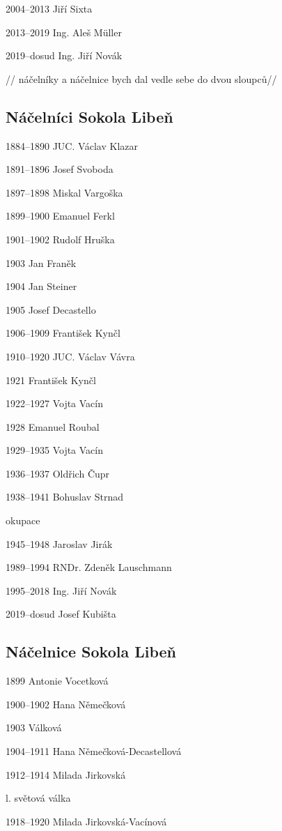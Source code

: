 \documentclass[a5paper, 11pt, twoside]{article}
\begin{document}
2004--2013 Jiří Sixta

2013--2019 Ing. Aleš Müller

2019--dosud Ing. Jiří Novák

// náčelníky a náčelnice bych dal vedle sebe do dvou sloupců//

\subsection{Náčelníci Sokola
Libeň}

1884--1890 JUC. Václav Klazar

1891--1896 Josef Svoboda

1897--1898 Miskal Vargoška

1899--1900 Emanuel Ferkl

1901--1902 Rudolf Hruška

1903 Jan Franěk

1904 Jan Steiner

1905 Josef Decastello

1906--1909 František Kynčl

1910--1920 JUC. Václav Vávra

1921 František Kynčl

1922--1927 Vojta Vacín

1928 Emanuel Roubal

1929--1935 Vojta Vacín

1936--1937 Oldřich Čupr

1938--1941 Bohuslav Strnad

okupace

1945--1948 Jaroslav Jirák

1989--1994 RNDr. Zdeněk Lauschmann

1995--2018 Ing. Jiří Novák

2019--dosud Josef Kubišta

\subsection{Náčelnice Sokola
Libeň}

1899 Antonie Vocetková

1900--1902 Hana Němečková

1903 Válková

1904--1911 Hana Němečková-Decastellová

1912--1914 Milada Jirkovská

l. světová válka

1918--1920 Milada Jirkovská-Vacínová
\end{document}
